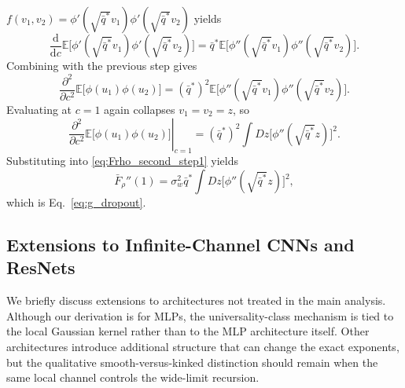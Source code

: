 \documentclass{article}
\theoremstyle{plain}
\theoremstyle{definition}
\theoremstyle{remark}
\begin{document}
\(
f(v_1,v_2)=\phi'(\sqrt{\bar q^*} v_1)\phi'(\sqrt{\bar q^*} v_2)
\)
yields
\relax
\begin{equation}
\frac{\mathrm d}{\mathrm dc} \mathbb E\Big[ \phi'(\sqrt{\bar q^*} v_1)\phi'(\sqrt{\bar q^*} v_2) \Big] = \bar q^* \mathbb E\Big[ \phi''(\sqrt{\bar q^*} v_1)\phi''(\sqrt{\bar q^*} v_2) \Big].
\end{equation}
\relax
Combining with the previous step gives
\relax
\begin{equation}
\frac{\partial^2}{\partial c^2} \mathbb E\big[\phi(u_1)\phi(u_2)\big] = (\bar q^*)^2 \mathbb E\Big[ \phi''(\sqrt{\bar q^*} v_1)\phi''(\sqrt{\bar q^*} v_2) \Big].
\end{equation}
\relax
Evaluating at \(c=1\) again collapses \(v_1=v_2=z\), so
\relax
\begin{equation}
\left.\frac{\partial^2}{\partial c^2} \mathbb E\big[\phi(u_1)\phi(u_2)\big]\right|_{c=1} = (\bar q^*)^2\int Dz \big[\phi''(\sqrt{\bar q^*} z)\big]^2.
\end{equation}
\relax
Substituting into \eqref{eq:Frho_second_step1} yields
\relax
\begin{equation}
\bar F_\rho''(1) = \sigma_w^2 \bar q^*\int Dz \big[\phi''(\sqrt{\bar q^*} z)\big]^2,
\end{equation}
\relax
which is Eq.~\eqref{eq:g_dropout}.

\FloatBarrier










\subsection{Extensions to Infinite-Channel CNNs and ResNets}
\label{app:cnn_extension}

We briefly discuss extensions to architectures not treated in the main analysis. Although our derivation is for MLPs, the universality-class mechanism is tied to the local Gaussian kernel rather than to the MLP architecture itself. Other architectures introduce additional structure that can change the exact exponents, but the qualitative smooth-versus-kinked distinction should remain when the same local channel controls the wide-limit recursion. 
\end{document}
